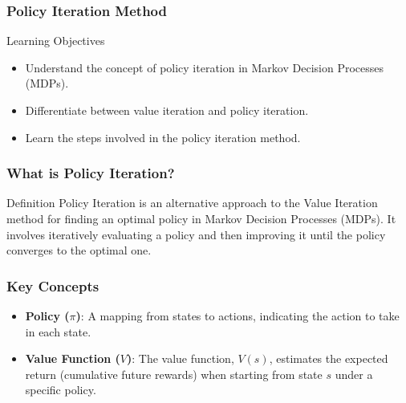 \documentclass[aspectratio=169]{beamer}
\begin{document}
\begin{frame}[fragile]
    \frametitle{Policy Iteration Method}
    \begin{block}{Learning Objectives}
        \begin{itemize}
            \item Understand the concept of policy iteration in Markov Decision Processes (MDPs).
            \item Differentiate between value iteration and policy iteration.
            \item Learn the steps involved in the policy iteration method.
        \end{itemize}
    \end{block}
\end{frame}

\begin{frame}[fragile]
    \frametitle{What is Policy Iteration?}
    \begin{block}{Definition}
        Policy Iteration is an alternative approach to the Value Iteration method for finding an optimal policy in Markov Decision Processes (MDPs). It involves iteratively evaluating a policy and then improving it until the policy converges to the optimal one.
    \end{block}
\end{frame}

\begin{frame}[fragile]
    \frametitle{Key Concepts}
    \begin{itemize}
        \item \textbf{Policy (\(\pi\))}: A mapping from states to actions, indicating the action to take in each state.
        \item \textbf{Value Function (\(V\))}: The value function, \( V(s) \), estimates the expected return (cumulative future rewards) when starting from state \(s\) under a specific policy.
    \end{itemize}
\end{frame}
\end{document}
